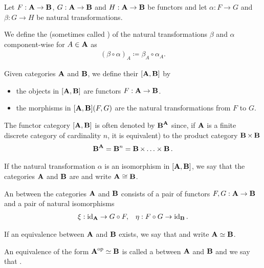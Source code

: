 \begin{definition}\label{def:natural_transformation_composition}
  Let $F: \operatorname{\mathbf{A}} \to \operatorname{\mathbf{B}}$, $G: \operatorname{\mathbf{A}} \to \operatorname{\mathbf{B}}$ and $H: \operatorname{\mathbf{A}} \to \operatorname{\mathbf{B}}$ be functors and let $\alpha: F \to G$ and $\beta: G \to H$ be natural transformations.

  We define the  (sometimes called ) of the natural transformations $\beta$ and $\alpha$ component-wise for $A \in \operatorname{\mathbf{A}}$ as
  \begin{align*}
    (\beta \circ \alpha)_A \coloneqq \beta_{A} \circ \alpha_A.
  \end{align*}
\end{definition}

\begin{definition}\label{def:functor_category}
  Given categories $\operatorname{\mathbf{A}}$ and $\operatorname{\mathbf{B}}$, we define their  $[\operatorname{\mathbf{A}}, \operatorname{\mathbf{B}}]$ by
  \begin{itemize}
    \item the objects in $[\operatorname{\mathbf{A}}, \operatorname{\mathbf{B}}]$ are functors $F: \operatorname{\mathbf{A}} \to \operatorname{\mathbf{B}}$.
    \item the morphisms in $[\operatorname{\mathbf{A}}, \operatorname{\mathbf{B}}](F, G)$ are the natural transformations from $F$ to $G$.
  \end{itemize}

  The functor category $[\operatorname{\mathbf{A}}, \operatorname{\mathbf{B}}]$ is often denoted by ${\operatorname{\mathbf{B}}}^{\operatorname{\mathbf{A}}}$ since, if $\operatorname{\mathbf{A}}$ is a finite discrete category of cardinality $n$, it is equivalent) to the product category $\operatorname{\mathbf{B}} \times \operatorname{\mathbf{B}}$
  \begin{align*}
    {\operatorname{\mathbf{B}}}^{\operatorname{\mathbf{A}}} = {\operatorname{\mathbf{B}}}^n = \operatorname{\mathbf{B}} \times \ldots \times \operatorname{\mathbf{B}}.
  \end{align*}

  If the natural transformation $\alpha$ is an isomorphism in $[\operatorname{\mathbf{A}}, \operatorname{\mathbf{B}}]$, we say that the categories $\operatorname{\mathbf{A}}$ and $\operatorname{\mathbf{B}}$ are  and write $\operatorname{\mathbf{A}} \cong \operatorname{\mathbf{B}}$.
\end{definition}

\begin{definition}\label{def:category_equivalence}\cite[definition 1.3.15]{Leinster2014}
  An  between the categories $\operatorname{\mathbf{A}}$ and $\operatorname{\mathbf{B}}$ consists of a pair of functors $F, G: \operatorname{\mathbf{A}} \to \operatorname{\mathbf{B}}$ and a pair of natural isomorphisms
  \begin{align*}
    \xi: \operatorname{id}_{\operatorname{\mathbf{A}}} \to G \circ F,
    &&
    \eta: F \circ G \to \operatorname{id}_{\operatorname{\mathbf{B}}}.
  \end{align*}

  If an equivalence between $\operatorname{\mathbf{A}}$ and $\operatorname{\mathbf{B}}$ exists, we say that  and write $\operatorname{\mathbf{A}} \simeq \operatorname{\mathbf{B}}$.

  An equivalence of the form $\operatorname{\mathbf{A}}^{\operatorname{op}} \simeq \operatorname{\mathbf{B}}$ is called a  between $\operatorname{\mathbf{A}}$ and $\operatorname{\mathbf{B}}$ and we say that  \cite[example 1.3.22]{Leinster2014}.
\end{definition}

